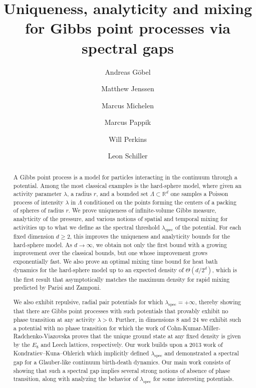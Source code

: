 \documentclass[10pt]{amsart}
\theoremstyle{definition}
\theoremstyle{remark}
\newcommand{\spec}{{\mathrm{spec}}}
\newcommand{\R}{\mathbb{R}}
\begin{document}
	
	\title{Uniqueness, analyticity and mixing for Gibbs point processes  via spectral gaps}
	
	
	\author{Andreas G\"obel}
	\address{Hasso Plattner Institute, University of Potsdam, Germany}
	\author{Matthew Jenssen}
	\address{King's College London, Department of Mathematics}
	\author{Marcus Michelen}
	\address{Northwestern University, Department of Mathematics}
	\author{Marcus Pappik}
	\address{Hasso Plattner Institute, University of Potsdam, Germany}
	\author{Will Perkins}
	\address{Georgia Institute of Technology, School of Computer Science}
	\author{Leon Schiller}
	\address{Hasso Plattner Institute, University of Potsdam, Germany}
	
	
	\begin{abstract}
		A Gibbs point process is a model for particles interacting in the continuum through a potential.  Among the most classical examples is the hard-sphere model, where given an activity parameter $\lambda$, a radius $r$, and a bounded set $\Lambda \subset \R^d$ one samples a Poisson process of intensity $\lambda$ in $\Lambda$ conditioned on the points forming the centers of a packing of  spheres of radius $r$.  We prove uniqueness of infinite-volume Gibbs measure, analyticity of the pressure, and various notions of spatial and temporal mixing for activities up to what we define as the spectral threshold $\lambda_{\spec}$ of the potential.  For each fixed dimension $d \geq 2$, this improves the uniqueness and analyticity bounds for the hard-sphere model.  As $d \to \infty$, we obtain not only the first bound with a growing improvement over the classical bounds, but one whose improvement grows exponentially fast.  
		{We also prove an optimal mixing time bound for heat bath dynamics for the hard-sphere model up to an expected density of $\Theta(d / 2^d)$, which is the first result that asymptotically matches the maximum density for rapid mixing predicted by Parisi and Zamponi.}
		
		
		We also exhibit repulsive, radial pair potentials for which $\lambda_{\spec} = + \infty$, thereby showing that there are Gibbs point processes with such potentials that provably exhibit no phase transition at any activity $\lambda > 0$.  Further, in dimensions $8$ and $24$ we exhibit such a potential with no phase transition for which the work of Cohn-Kumar-Miller-Radchenko-Viazovska proves that the unique ground state at any fixed density is given by the $E_8$ and Leech lattices, respectively.  
		Our work builds upon a 2013 work of Kondratiev--Kuna--Ohlerich which implicitly defined $\lambda_{\spec}$ and demonstrated a spectral gap for a Glauber-like continuum birth-death dynamics.  Our main work consists of showing that such a spectral gap implies {several strong notions of absence of phase transition,} along with analyzing the behavior of $\lambda_\spec$ {for some interesting potentials}.
	\end{abstract}
	\date{}
	
\end{document}
